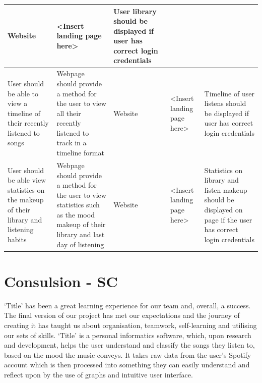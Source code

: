 \documentclass[11pt]{report}
\begin{document}
\begin{center}
\begin{longtable}{| p{2.5cm} | p{6cm} | p{2cm} | p{2cm} | p{2.5cm} | }
Website&
<Insert landing page here>&
User library should be displayed if user has correct login credentials \\
\hline
User should be able to view a timeline of their recently listened to songs&
Webpage should provide a method for the user to view all their recently listened to track in a timeline format&
Website&
<Insert landing page here>&
Timeline of user listens should be displayed if user has correct login credentials \\
\hline
User should be able view statistics on the makeup of their library and listening habits&
Webpage should provide a method for the user to view statistics such as the mood makeup of their library and last day of listening&
Website&
<Insert landing page here>&
Statistics on library and listen makeup should be displayed on page if the user has correct login credentials \\
\hline


\end{longtable}

\end{center}

\chapter{Consulsion  - SC}

‘Title’ has been a great learning experience for our team and, overall, a success. The final version of our project has met our expectations and the journey of creating it has taught us about organisation, teamwork, self-learning and utilising our sets of skills. ‘Title’ is a personal informatics software, which, upon research and development, helps the user understand and classify the songs they listen to, based on the mood the music conveys. It takes raw data from the user’s Spotify account which is then processed into something they can easily understand and reflect upon by the use of graphs and intuitive user interface. 
\end{document}
